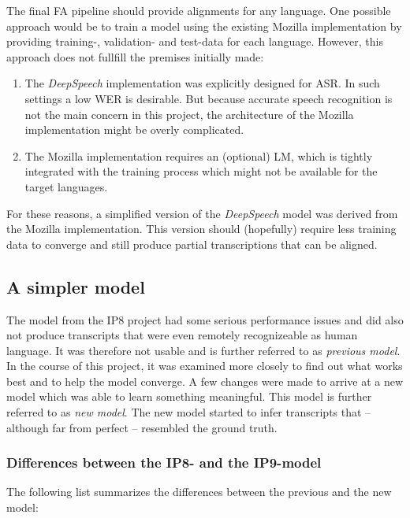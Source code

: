 The final \ac{FA} pipeline should provide alignments for any language. One possible approach would be to train a model using the existing Mozilla implementation by providing training-, validation- and test-data for each language. However, this approach does not fullfill the premises initially made:

\begin{enumerate}
	\item The \textit{DeepSpeech} implementation was explicitly designed for \ac{ASR}. In such settings a low \ac{WER} is desirable. But because accurate speech recognition is not the main concern in this project, the architecture of the Mozilla implementation might be overly complicated.
	\item The Mozilla implementation requires an (optional) \ac{LM}, which is tightly integrated with the training process which might not be available for the target languages.
\end{enumerate}

For these reasons, a simplified version of the \textit{DeepSpeech} model was derived from the Mozilla implementation. This version should (hopefully) require less training data to converge and still produce partial transcriptions that can be aligned.

\subsection{A simpler model}

The model from the IP8 project had some serious performance issues and did also not produce transcripts that were even remotely recognizeable as human language. It was therefore not usable and is further referred to as \textit{previous model}. In the course of this project, it was examined more closely to find out what works best and to help the model converge. A few changes were made to arrive at a new model which was able to learn something meaningful. This model is further referred to as \textit{new model}. The new model started to infer transcripts that -- although far from perfect -- resembled the ground truth. 

\subsubsection{Differences between the IP8- and the IP9-model}
The following list summarizes the differences between the previous and the new model:

